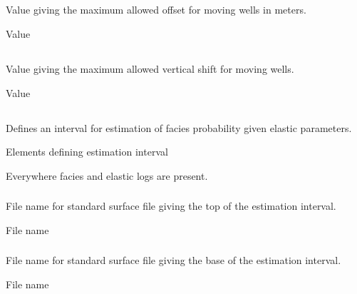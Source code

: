 \subsection{}
 \slist
   \item \Description Value giving the maximum allowed offset for moving wells in meters.
   \item \Argument Value
   \item {}
 \elist

\subsection{}
 \slist
   \item \Description Value giving the maximum allowed vertical shift for moving wells.
   \item \Argument Value
   \item {}
 \elist

\subsection{}
 \slist
   \item \Description Defines an interval for estimation of facies probability given elastic parameters.
   \item \Argument Elements defining estimation interval
   \item \Default Everywhere facies and elastic logs are present.
 \elist

\subsubsection{}
 \slist
   \item \Description File name for standard surface file giving the top of the estimation interval.
   \item \Argument File name
   \item \Default
 \elist

\subsubsection{}
 \slist
   \item \Description File name for standard surface file giving the base of the estimation interval.
   \item \Argument File name
   \item \Default
 \elist

